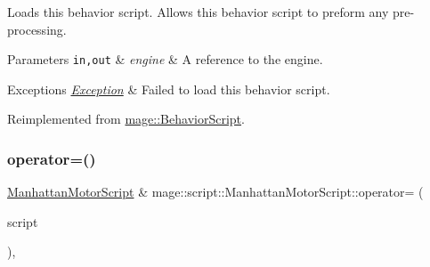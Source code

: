 Loads this behavior script. Allows this behavior script to preform any pre-\/processing.


\begin{DoxyParams}[1]{Parameters}
\mbox{\tt in,out}  & {\em engine} & A reference to the engine. \\
\hline
\end{DoxyParams}

\begin{DoxyExceptions}{Exceptions}
{\em \mbox{\hyperlink{classmage_1_1_exception}{Exception}}} & Failed to load this behavior script. \\
\hline
\end{DoxyExceptions}


Reimplemented from \mbox{\hyperlink{classmage_1_1_behavior_script_ae7864876b2ffb1d1d8d8a56e3099f1f2}{mage\+::\+Behavior\+Script}}.

\mbox{\label{classmage_1_1script_1_1_manhattan_motor_script_a1c4dc4ffae903942248c7f744b0d019f}} 
\subsubsection{\texorpdfstring{operator=()}{operator=()}\hspace{0.1cm}{\footnotesize\ttfamily [1/2]}}
{\footnotesize\ttfamily \mbox{\hyperlink{classmage_1_1script_1_1_manhattan_motor_script}{Manhattan\+Motor\+Script}} \& mage\+::script\+::\+Manhattan\+Motor\+Script\+::operator= (\begin{DoxyParamCaption}\item[{const \mbox{\hyperlink{classmage_1_1script_1_1_manhattan_motor_script}{Manhattan\+Motor\+Script}} \&}]{script }\end{DoxyParamCaption})\hspace{0.3cm}{\ttfamily [default]}, {\ttfamily [noexcept]}}

\mbox{\label{classmage_1_1script_1_1_manhattan_motor_script_a3184ea5b921fbdbd81173db3f7042a0c}} 
